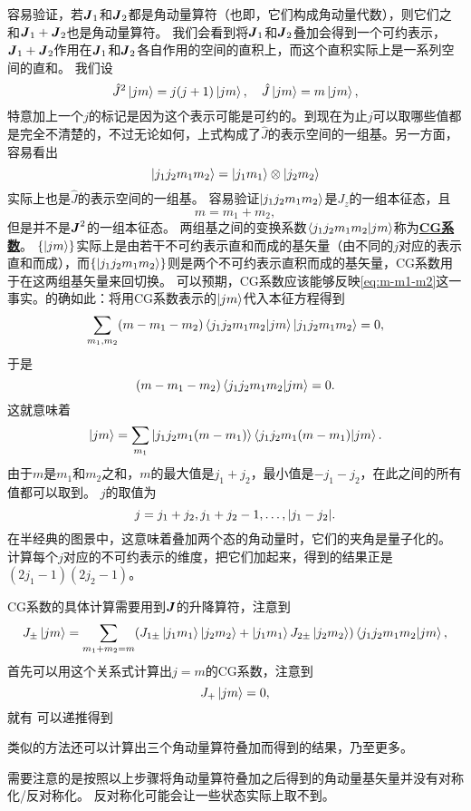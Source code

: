 \documentclass[hyperref, UTF8, a4paper]{ctexart}
\newcommand{\concept}[1]{\underline{\textbf{#1}}}
\begin{document}
容易验证，若$\vb*{J}_1$和$\vb*{J}_2$都是角动量算符（也即，它们构成角动量代数），则它们之和$\vb*{J}_1 + \vb*{J}_2$也是角动量算符。
我们会看到将$\vb*{J}_1$和$\vb*{J}_2$叠加会得到一个可约表示，$\vb*{J}_1 + \vb*{J}_2$作用在$\vb*{J}_1$和$\vb*{J}_2$各自作用的空间的直积上，而这个直积实际上是一系列空间的直和。
我们设
\[
    \hat{J}^2 \ket{jm} = j(j+1) \ket{jm}, \quad \hat{J} \ket{jm} = m \ket{jm},
\]
特意加上一个$j$的标记是因为这个表示可能是可约的。到现在为止$j$可以取哪些值都是完全不清楚的，不过无论如何，上式构成了$\hat{J}$的表示空间的一组基。另一方面，容易看出
\[
    \ket{j_1 j_2 m_1 m_2} = \ket{j_1 m_1} \otimes \ket{j_2 m_2}
\]
实际上也是$\hat{J}$的表示空间的一组基。
容易验证$\ket{j_1 j_2 m_1 m_2}$是$J_z$的一组本征态，且
\begin{equation}
    m = m_1 + m_2,
    \label{eq:m-m1-m2}
\end{equation}
但是并不是$\vb*{J}^2$的一组本征态。
两组基之间的变换系数$\braket{j_1 j_2 m_1 m_2}{j m}$称为\concept{CG系数}。
$\{\ket{jm}\}$实际上是由若干不可约表示直和而成的基矢量（由不同的$j$对应的表示直和而成），而$\{\ket{j_1 j_2 m_1 m_2}\}$则是两个不可约表示直积而成的基矢量，CG系数用于在这两组基矢量来回切换。
可以预期，CG系数应该能够反映\eqref{eq:m-m1-m2}这一事实。的确如此：将用CG系数表示的$\ket{jm}$代入本征方程得到
\[
    \sum_{m_1, m_2} (m - m_1 - m_2) \braket{j_1 j_2 m_1 m_2}{j m} \ket{j_1 j_2 m_1 m_2} = 0,
\]
于是
\[
    (m - m_1 - m_2) \braket{j_1 j_2 m_1 m_2}{j m} = 0.
\]
这就意味着
\[
    \ket{jm} = \sum_{m_1} \ket{j_1 j_2 m_1 (m-m_1)} \braket{j_1 j_2 m_1 (m-m_1)}{jm}.
\]
由于$m$是$m_1$和$m_2$之和，$m$的最大值是$j_1+j_2$，最小值是$-j_1-j_2$，在此之间的所有值都可以取到。
$j$的取值为
\[
    j = j_1 + j_2, j_1 + j_2 - 1, \ldots, \abs{j_1 - j_2}.
\]
在半经典的图景中，这意味着叠加两个态的角动量时，它们的夹角是量子化的。
计算每个$j$对应的不可约表示的维度，把它们加起来，得到的结果正是$(2j_1 - 1) (2j_2 - 1)$。

CG系数的具体计算需要用到$\vb*{J}$的升降算符，注意到
\begin{equation}
    J_{\pm} \ket{jm} = \sum_{m_1 + m_2 = m} (J_{1 \pm} \ket{j_1 m_1} \ket{j_2 m_2} + \ket{j_1 m_1} J_{2 \pm} \ket{j_2 m_2}) \braket{j_1 j_2 m_1 m_2}{jm},
    \label{eq:addition-of-ca-opearator-su2}
\end{equation}
首先可以用这个关系式计算出$j=m$的CG系数，注意到
\[
    J_+ \ket{jm} = 0,
\]
就有
可以递推得到

类似的方法还可以计算出三个角动量算符叠加而得到的结果，乃至更多。

需要注意的是按照以上步骤将角动量算符叠加之后得到的角动量基矢量并没有对称化/反对称化。
反对称化可能会让一些状态实际上取不到。
\end{document}
